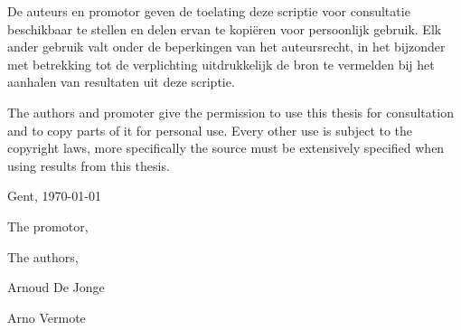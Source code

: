 

\par\vspace*{\fill}

De auteurs en promotor geven de toelating deze scriptie voor consultatie beschikbaar te stellen en delen ervan te kopi\"eren voor persoonlijk gebruik. Elk ander gebruik valt onder de beperkingen van het auteursrecht, in het bijzonder met betrekking tot de verplichting uitdrukkelijk de bron te vermelden bij het aanhalen van resultaten uit deze scriptie.

The authors and promoter give the permission to use this thesis for consultation and to copy parts of it for personal use. Every other use is subject to the copyright laws, more specifically the source must be extensively specified when using results from this thesis.

\vspace{1cm}

Gent, \today %

\vspace{1cm}

\begin{minipage}[t][4cm][t]{0.5\textwidth}
\raggedright
The promotor,

\vspace{2.5cm}

\insertpromotor %
\end{minipage}
\begin{minipage}[t][4cm][t]{0.48\textwidth}
\raggedright
The authors,

\vspace{2.5cm}

Arnoud De Jonge

Arno Vermote
\end{minipage}

\thispagestyle{empty}

